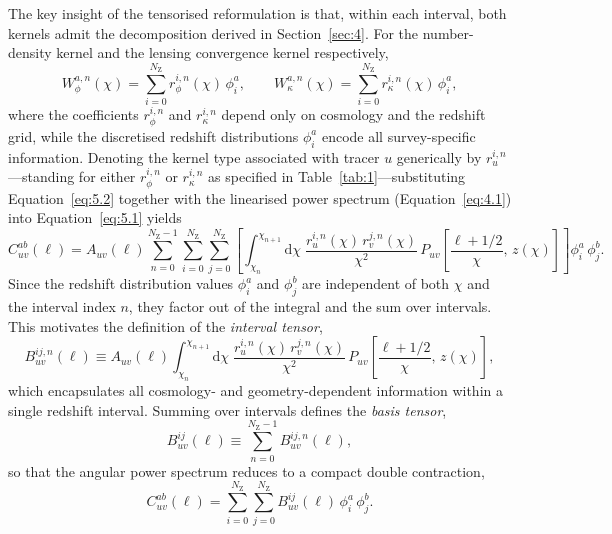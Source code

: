 The key insight of the tensorised reformulation is that, within each interval, both kernels admit the decomposition derived in Section~\ref{sec:4}. For the number-density kernel and the lensing convergence kernel respectively,
\begin{equation} \label{eq:5.2}
    W_\phi^{a,n}(\chi) = \sum_{i=0}^{N_\mathrm{Z}} r_\phi^{i,n}(\chi)\,\phi^{a}_{i}, \qquad
    W_\kappa^{a,n}(\chi) = \sum_{i=0}^{N_\mathrm{Z}} r_\kappa^{i,n}(\chi)\,\phi^{a}_{i},
\end{equation}
where the coefficients \(r_\phi^{i,n}\) and \(r_\kappa^{i,n}\) depend only on cosmology and the redshift grid, while the discretised redshift distributions \(\phi^{a}_{i}\) encode all survey-specific information. Denoting the kernel type associated with tracer \(u\) generically by \(r_u^{i,n}\)---standing for either \(r_\phi^{i,n}\) or \(r_\kappa^{i,n}\) as specified in Table~\ref{tab:1}---substituting Equation~\ref{eq:5.2} together with the linearised power spectrum (Equation~\ref{eq:4.1}) into Equation~\ref{eq:5.1} yields
\begin{equation} \label{eq:5.3}
    C_{uv}^{ab}(\ell) = A_{uv}(\ell) \sum_{n=0}^{N_\mathrm{Z}-1} \sum_{i=0}^{N_\mathrm{Z}} \sum_{j=0}^{N_\mathrm{Z}} \left[\int_{\chi_n}^{\chi_{n+1}} \mathrm{d}\chi\; \frac{r_u^{i,n}(\chi)\,r_v^{j,n}(\chi)}{\chi^2}\, P_{uv}\!\left[\frac{\ell+1/2}{\chi},\, z(\chi)\right]\right] \phi^{a}_{i}\,\phi^{b}_{j}.
\end{equation}
Since the redshift distribution values \(\phi^{a}_{i}\) and \(\phi^{b}_{j}\) are independent of both \(\chi\) and the interval index \(n\), they factor out of the integral and the sum over intervals. This motivates the definition of the \emph{interval tensor},
\begin{equation} \label{eq:5.4}
    B_{uv}^{ij,n}(\ell) \equiv A_{uv}(\ell) \int_{\chi_n}^{\chi_{n+1}} \mathrm{d}\chi\; \frac{r_u^{i,n}(\chi)\,r_v^{j,n}(\chi)}{\chi^2}\, P_{uv}\!\left[\frac{\ell+1/2}{\chi},\, z(\chi)\right],
\end{equation}
which encapsulates all cosmology- and geometry-dependent information within a single redshift interval. Summing over intervals defines the \emph{basis tensor},
\begin{equation} \label{eq:5.5}
    B_{uv}^{ij}(\ell) \equiv \sum_{n=0}^{N_\mathrm{Z}-1} B_{uv}^{ij,n}(\ell),
\end{equation}
so that the angular power spectrum reduces to a compact double contraction,
\begin{equation} \label{eq:5.6}
    \boxed{C_{uv}^{ab}(\ell) = \sum_{i=0}^{N_\mathrm{Z}} \sum_{j=0}^{N_\mathrm{Z}} B_{uv}^{ij}(\ell)\,\phi^{a}_{i}\,\phi^{b}_{j}.}
\end{equation}

